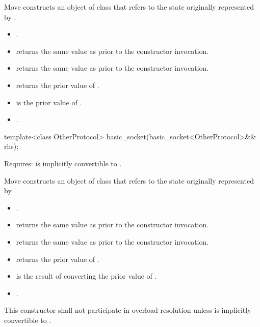 \begin{itemdescr}
\pnum
\effects Move constructs an object of class  that refers to the state originally represented by .

\pnum
\postconditions 
\begin{itemize}
\item
{}.
\item
{} returns the same value as  prior to the constructor invocation.
\item
{} returns the same value as  prior to the constructor invocation.
\item
{} returns the prior value of .
\item
{} is the prior value of .
\item
{}.
\end{itemize}
\end{itemdescr}

\begin{itemdecl}
template<class OtherProtocol>
  basic_socket(basic_socket<OtherProtocol>&& rhs);
\end{itemdecl}

\begin{itemdescr}
\pnum
Requires:  is implicitly convertible to .

\pnum
\effects Move constructs an object of class  that refers to the state originally represented by .

\pnum
\postconditions 
\begin{itemize}
\item
{}.
\item
{} returns the same value as  prior to the constructor invocation.
\item
{} returns the same value as  prior to the constructor invocation.
\item
{} returns the prior value of .
\item
{} is the result of converting the prior value of .
\item
{}.
\end{itemize}

\pnum
\remarks This constructor shall not participate in overload resolution unless  is implicitly convertible to .
\end{itemdescr}



